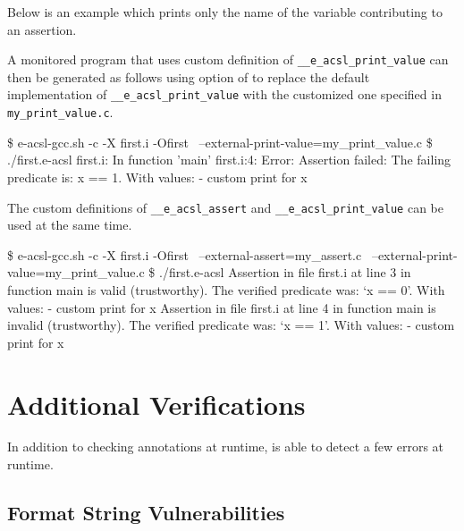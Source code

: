 Below is an example which prints only the name of the variable contributing to
an assertion.


A monitored program that uses custom definition of
\texttt{\_\_e\_acsl\_print\_value} can then be
generated as follows using  option of \eacslgcc to
replace the default implementation of \texttt{\_\_e\_acsl\_print\_value}
 with the customized one specified in
\texttt{my\_print\_value.c}.

\begin{logs}
\$ e-acsl-gcc.sh -c -X first.i -Ofirst \
    --external-print-value=my_print_value.c
\$ ./first.e-acsl
first.i: In function 'main'
first.i:4: Error: Assertion failed:
        The failing predicate is:
        x == 1.
        With values:
        - custom print for x
\end{logs}

The custom definitions of \texttt{\_\_e\_acsl\_assert}
and \texttt{\_\_e\_acsl\_print\_value}\codeidxdef{e\_acsl\_print\_value} can be
used at the same time.

\begin{logs}
\$ e-acsl-gcc.sh -c -X first.i -Ofirst \
    --external-assert=my_assert.c \
    --external-print-value=my_print_value.c
\$ ./first.e-acsl
Assertion in file first.i at line 3 in function main is valid (trustworthy).
The verified predicate was: `x == 0'.
With values:
        - custom print for x
Assertion in file first.i at line 4 in function main is invalid (trustworthy).
The verified predicate was: `x == 1'.
With values:
        - custom print for x
\end{logs}

\section{Additional Verifications} %

In addition to checking annotations at runtime, \eacsl is able to detect a few
errors at runtime.

\subsection{Format String Vulnerabilities}

